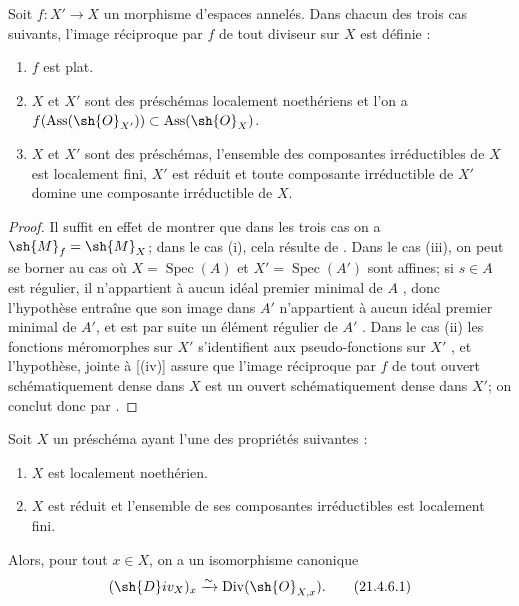 \begin{proposition}[21.4.5]
\label{IV.21.4.5}
Soit $f:X'\to X$ un morphisme d'espaces annelés.
Dans chacun des trois cas suivants, l'image réciproque par $f$ de tout diviseur sur $X$ est définie :
\begin{enumerate}[label=\textup{(\roman*)}]
  \item $f$ est plat.
  \item $X$ et $X'$ sont des préschémas localement noethériens et l'on a $f(\operatorname{Ass}(\sh{O}_{X'}))\subset\operatorname{Ass}(\sh{O}_X)$.
  \item $X$ et $X'$ sont des préschémas, l'ensemble des composantes irréductibles de $X$ est localement fini, $X'$ est réduit et toute composante irréductible de $X'$ domine une composante irréductible de $X$.
\end{enumerate}
\end{proposition}

\begin{proof}
Il suffit en effet de montrer que dans les trois cas on a $\sh{M}_f=\sh{M}_X$;
dans le cas (i), cela résulte de .
Dans le cas (iii), on peut se borner au cas où $X=\operatorname{Spec}(A)$ et $X'=\operatorname{Spec}(A')$ sont affines;
si $s\in A$ est régulier, il n'appartient à aucun idéal premier minimal de $A$ , donc l'hypothèse entraîne que son image dans $A'$ n'appartient à aucun idéal premier minimal de $A'$, et est par suite un élément régulier de $A'$ .
Dans le cas (ii) les fonctions méromorphes sur $X'$ s'identifient aux pseudo-fonctions sur $X'$ , et l'hypothèse, jointe à [(iv)] assure que l'image réciproque
par $f$ de tout ouvert schématiquement dense dans $X$ est un ouvert schématiquement dense dans $X'$;
on conclut donc par .
\end{proof}

\begin{corollary}[21.4.6]
\label{IV.21.4.6}
Soit $X$ un préschéma ayant l'une des propriétés suivantes :
\begin{enumerate}[label=\textup{(\roman*)}]
  \item $X$ est localement noethérien.
  \item $X$ est réduit et l'ensemble de ses composantes irréductibles est localement fini.
\end{enumerate}
Alors, pour tout $x\in X$, on a un isomorphisme canonique
\[
\label{IV.21.4.6.1}
  (\sh{D}iv_X)_x\xrightarrow{\sim}\operatorname{Div}(\sh{O}_{X,x}).
  \tag{21.4.6.1}
\]
\end{corollary}

